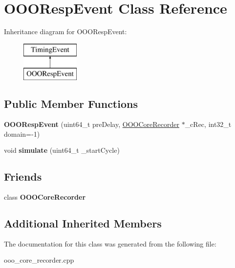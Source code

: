 \hypertarget{classOOORespEvent}{\section{O\-O\-O\-Resp\-Event Class Reference}
\label{classOOORespEvent}
}
Inheritance diagram for O\-O\-O\-Resp\-Event\-:\begin{figure}[H]
\begin{center}
\leavevmode
\includegraphics[height=2.000000cm]{classOOORespEvent}
\end{center}
\end{figure}
\subsection*{Public Member Functions}
\begin{DoxyCompactItemize}
\item 
\hypertarget{classOOORespEvent_a0b0b60c2c1674662e6765a69098071a6}{{\bfseries O\-O\-O\-Resp\-Event} (uint64\-\_\-t pre\-Delay, \hyperlink{classOOOCoreRecorder}{O\-O\-O\-Core\-Recorder} $\ast$\-\_\-c\-Rec, int32\-\_\-t domain=-\/1)}\label{classOOORespEvent_a0b0b60c2c1674662e6765a69098071a6}

\item 
\hypertarget{classOOORespEvent_a97234f26e90f16fd0a671cb794b44f72}{void {\bfseries simulate} (uint64\-\_\-t \-\_\-start\-Cycle)}\label{classOOORespEvent_a97234f26e90f16fd0a671cb794b44f72}

\end{DoxyCompactItemize}
\subsection*{Friends}
\begin{DoxyCompactItemize}
\item 
\hypertarget{classOOORespEvent_a37611ab84823dbefbe11233ca80682d0}{class {\bfseries O\-O\-O\-Core\-Recorder}}\label{classOOORespEvent_a37611ab84823dbefbe11233ca80682d0}

\end{DoxyCompactItemize}
\subsection*{Additional Inherited Members}


The documentation for this class was generated from the following file\-:\begin{DoxyCompactItemize}
\item 
ooo\-\_\-core\-\_\-recorder.\-cpp\end{DoxyCompactItemize}
